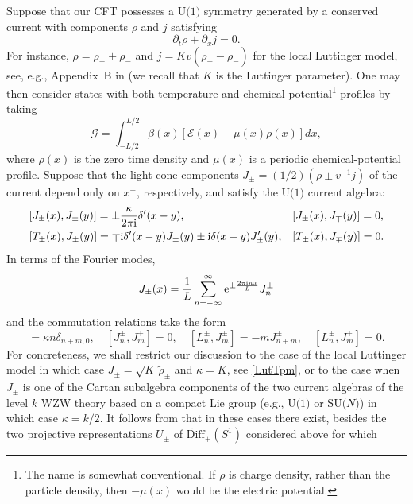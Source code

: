 \documentclass[12pt,a4paper]{article}
\newcommand{\SL}{S^1}
\newcommand{\wDiff}{\widetilde{\mathrm{Diff}}}
\newcommand{\ee}{{\rm e}}
\newcommand{\ii}{{\rm i}}
\newcommand{\cE}{\mathcal{E}}
\newcommand{\cG}{\mathcal{G}}
\theoremstyle{definition}
\theoremstyle{remark}
\begin{document}
Suppose that our CFT possesses a $\text{U(1)}$ symmetry generated by a conserved current with components $\rho$ and $j$ satisfying 
%
\begin{equation}
\partial_{t} \rho + \partial_{x} j = 0.
\end{equation}
%
For instance, $\rho = \rho_{+}+\rho_{-}$ and $j = Kv (\rho_{+}-\rho_{-})$ for
the local Luttinger model, see, e.g., Appendix~B in \cite{LLMM1} (we recall that $K$ is the 
Luttinger parameter).
One may then consider states with both temperature and chemical-potential\footnote{The name is somewhat conventional.
If $\rho$ is charge density, rather than the particle density, then $-\mu(x)$ would be the electric potential.} profiles by taking 
%
\begin{equation}
\label{cGmu}  
\cG = \int_{-L/2}^{L/2}\beta(x) \left[ \cE(x) - \mu(x)\rho(x) \right] dx,
\end{equation}
%
where $\rho(x)$ is the zero time density and $\mu(x)$ is a periodic chemical-potential profile.
Suppose that the light-cone components $J_{\pm} = (1/2)(\rho \pm v^{-1} j)$ of the current depend only on $x^\mp$, respectively, and satisfy the $\text{U(1)}$ current algebra:
%
\begin{align}
& [J_{\pm}(x),J_{\pm}(y)]
= \pm \frac{\kappa}{2\pi\ii}\delta'(x-y),
&& [J_{\pm}(x),J_{\mp}(y)]
= 0, \\ 
& [T_{\pm}(x),J_{\pm}(y)]
= \mp \ii\delta'(x-y)J_{\pm}(y) \pm \ii\delta(x-y)J'_{\pm}(y),
&& [T_{\pm}(x),J_{\mp}(y)]
= 0.
\end{align}
%
In terms of the Fourier modes,
%
\begin{equation}
J_{\pm}(x)
= \frac{1}{L} \sum_{n=-\infty}^\infty
	\ee^{\pm\frac{2\pi\ii n x}{L}}J^\pm_n
\end{equation}
%
and the commutation relations take the form
%
\begin{equation}
[J^\pm_n,J^\pm_m] = \kappa n\delta_{n+m,0},
\quad
[J^\pm_n,J^\mp_m] = 0,
\quad
[L_n^\pm,J^\pm_m] = -mJ^\pm_{n+m},
\quad
[L_n^\pm,J^\mp_m] = 0.
\end{equation}
%
For concreteness, we shall restrict our discussion to the case of the local Luttinger model in which case $J_{\pm}=\sqrt{K}\,\tilde{\rho}_{\pm}$ and $\kappa = K$, see \eqref{LutTpm}, or to the case when $J_{\pm}$ is one of the Cartan subalgebra components of the two current algebras of the level $k$ WZW theory based on a compact Lie group \cite{FMS} (e.g., $\text{U(1)}$ or $\text{SU(}N\text{)}$)
in which case $\kappa={k}/{2}$.
It follows from \cite{GW1,GW2} that in these cases there exist, besides the two projective representations $U_{\pm}$ of $\wDiff_+(\SL)$ considered above for which
\end{document}
